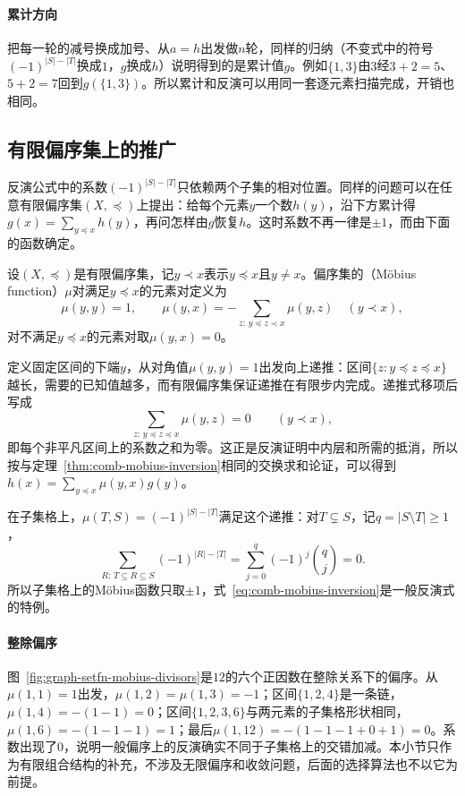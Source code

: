 \paragraph{累计方向}
把每一轮的减号换成加号、从$a=h$出发做$n$轮，同样的归纳（不变式中的符号$(-1)^{|S|-|T|}$换成$1$，$g$换成$h$）说明得到的是累计值$g$。例如$\{1,3\}$由$3$经$3+2=5$、$5+2=7$回到$g(\{1,3\})$。所以累计和反演可以用同一套逐元素扫描完成，开销也相同。

\subsection{有限偏序集上的推广}
\label{sec:graph-setfn-poset-mobius}

反演公式中的系数$(-1)^{|S|-|T|}$只依赖两个子集的相对位置。同样的问题可以在任意有限偏序集$(X,\preceq)$上提出：给每个元素$y$一个数$h(y)$，沿下方累计得$g(x)=\sum_{y\preceq x}h(y)$，再问怎样由$g$恢复$h$。这时系数不再一律是$\pm1$，而由下面的函数确定。

\begin{definition}[Möbius 函数]
\label{def:graph-setfn-mobius-function}
设$(X,\preceq)$是有限偏序集，记$y\prec x$表示$y\preceq x$且$y\neq x$。偏序集的（Möbius function）$\mu$对满足$y\preceq x$的元素对定义为
\[
  \mu(y,y)=1,\qquad \mu(y,x)=-\sum_{z:\,y\preceq z\prec x}\mu(y,z)\quad(y\prec x),
\]
对不满足$y\preceq x$的元素对取$\mu(y,x)=0$。
\end{definition}

定义固定区间的下端$y$，从对角值$\mu(y,y)=1$出发向上递推：区间$\{z:y\preceq z\preceq x\}$越长，需要的已知值越多，而有限偏序集保证递推在有限步内完成。递推式移项后写成
\[
  \sum_{z:\,y\preceq z\preceq x}\mu(y,z)=0\qquad(y\prec x),
\]
即每个非平凡区间上的系数之和为零。这正是反演证明中内层和所需的抵消，所以按与定理~\ref{thm:comb-mobius-inversion}相同的交换求和论证，可以得到$h(x)=\sum_{y\preceq x}\mu(y,x)g(y)$。

在子集格上，$\mu(T,S)=(-1)^{|S|-|T|}$满足这个递推：对$T\subsetneq S$，记$q=|S\setminus T|\geq1$，
\[
  \sum_{R:\,T\subseteq R\subseteq S}(-1)^{|R|-|T|}=\sum_{j=0}^{q}(-1)^j\binom qj=0.
\]
所以子集格上的Möbius函数只取$\pm1$，式~\eqref{eq:comb-mobius-inversion}是一般反演式的特例。

\paragraph{整除偏序}
图~\ref{fig:graph-setfn-mobius-divisors}是$12$的六个正因数在整除关系下的偏序。从$\mu(1,1)=1$出发，$\mu(1,2)=\mu(1,3)=-1$；区间$\{1,2,4\}$是一条链，$\mu(1,4)=-(1-1)=0$；区间$\{1,2,3,6\}$与两元素的子集格形状相同，$\mu(1,6)=-(1-1-1)=1$；最后$\mu(1,12)=-(1-1-1+0+1)=0$。系数出现了$0$，说明一般偏序上的反演确实不同于子集格上的交错加减。本小节只作为有限组合结构的补充，不涉及无限偏序和收敛问题，后面的选择算法也不以它为前提。

